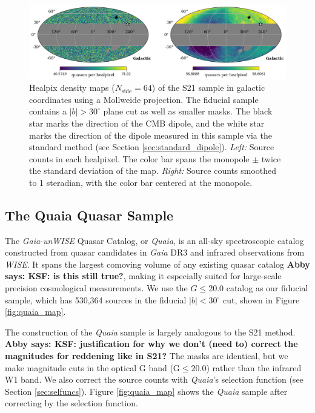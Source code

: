 \documentclass[modern]{aastex631}
\newcommand{\abby}[1]{\textbf{Abby says: #1}}
\newcommand{\quaia}{\textsl{Quaia}\xspace}
\newcommand{\gaia}{\textsl{Gaia}\xspace}
\newcommand{\wise}{\textsl{WISE}\xspace}
\newcommand{\unwise}{\textsl{unWISE}\xspace}
\newcommand{\nside}{N_\mathrm{side}}
\begin{document}
\begin{figure}
    \centering
    \includegraphics[width=\textwidth]{images/catwise_map.png}
    \caption{Healpix density maps ($\nside=64$) of the S21 sample in galactic coordinates using a Mollweide projection. The fiducial sample contains a $|b|>30^\circ$ plane cut as well as smaller masks. The black star marks the direction of the CMB dipole, and the white star marks the direction of the dipole measured in this sample via the standard method (see Section \ref{sec:standard_dipole}). \textit{Left:} Source counts in each healpixel. The color bar spans the monopole $\pm$ twice the standard deviation of the map. \textit{Right:} Source counts smoothed to 1 steradian, with the color bar centered at the monopole.}
    \label{fig:S21_map}
\end{figure}


\subsection{The Quaia Quasar Sample}
\label{sec:quaia}
The \gaia-\unwise Quasar Catalog, or \quaia, is an all-sky spectroscopic catalog constructed from quasar candidates in \gaia DR3 and infrared observations from \wise \citep{storey-fisher_quaia_2023}.
It spans the largest comoving volume of any existing quasar catalog \abby{KSF: is this still true?}, making it especially suited for large-scale precision cosmological measurements.
We use the $G\leq 20.0$ catalog as our fiducial sample, which has 530,364 sources in the fiducial $|b|<30^\circ$ cut, shown in Figure \ref{fig:quaia_map}.

The construction of the \quaia sample is largely analogous to the S21 method.
\abby{KSF: justification for why we don't (need to) correct the magnitudes for reddening like in S21?}
The masks are identical, but we make magnitude cuts in the optical G band ($\mathrm{G}\leq 20.0$) rather than the infrared W1 band.
We also correct the source counts with \quaia's selection function (see Section \ref{sec:selfuncs}).
Figure \ref{fig:quaia_map} shows the \quaia sample after correcting by the selection function.
\end{document}

